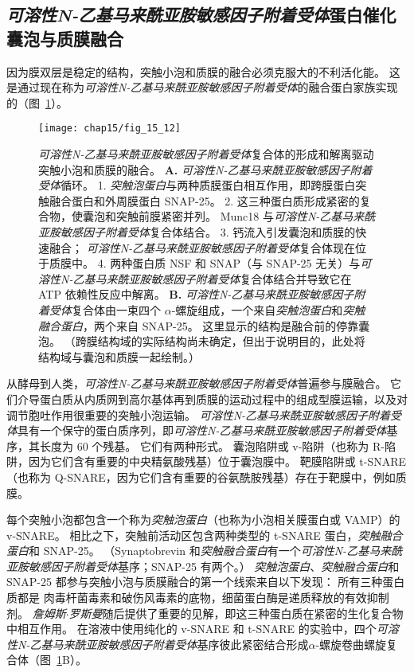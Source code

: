 \subsection{\textit{可溶性N-乙基马来酰亚胺敏感因子附着受体}蛋白催化囊泡与质膜融合}

因为膜双层是稳定的结构，突触小泡和质膜的融合必须克服大的不利活化能。
这是通过现在称为\textit{可溶性N-乙基马来酰亚胺敏感因子附着受体}的融合蛋白家族实现的（图~\ref{fig:15_12}）。


\begin{figure}[htbp]
	\centering
	\texttt{[image: chap15/fig\_15\_12]}
	\caption{\textit{可溶性N-乙基马来酰亚胺敏感因子附着受体}复合体的形成和解离驱动突触小泡和质膜的融合\cite{rizo2002snares}。
		 \textbf{A.} \textit{可溶性N-乙基马来酰亚胺敏感因子附着受体}循环。
		 1. \textit{突触泡蛋白}与两种质膜蛋白相互作用，即跨膜蛋白突触融合蛋白和外周膜蛋白 SNAP-25。
		 2. 这三种蛋白质形成紧密的复合物，使囊泡和突触前膜紧密并列。
		 Munc18 与\textit{可溶性N-乙基马来酰亚胺敏感因子附着受体}复合体结合。
		 3. 钙流入引发囊泡和质膜的快速融合；
		 \textit{可溶性N-乙基马来酰亚胺敏感因子附着受体}复合体现在位于质膜中。
		 4. 两种蛋白质 NSF 和 SNAP（与 SNAP-25 无关）与\textit{可溶性N-乙基马来酰亚胺敏感因子附着受体}复合体结合并导致它在 ATP 依赖性反应中解离。
		 \textbf{B.} \textit{可溶性N-乙基马来酰亚胺敏感因子附着受体}复合体由一束四个 $\alpha$-螺旋组成，一个来自\textit{突触泡蛋白}和\textit{突触融合蛋白}，两个来自 SNAP-25。
		 这里显示的结构是融合前的停靠囊泡。
		 （跨膜结构域的实际结构尚未确定，但出于说明目的，此处将结构域与囊泡和质膜一起绘制。）}
	\label{fig:15_12}
\end{figure}


从酵母到人类，\textit{可溶性N-乙基马来酰亚胺敏感因子附着受体}普遍参与膜融合。
它们介导蛋白质从内质网到高尔基体再到质膜的运动过程中的组成型膜运输，以及对调节胞吐作用很重要的突触小泡运输。
\textit{可溶性N-乙基马来酰亚胺敏感因子附着受体}具有一个保守的蛋白质序列，即\textit{可溶性N-乙基马来酰亚胺敏感因子附着受体}基序，其长度为 60 个残基。
它们有两种形式。
囊泡陷阱或 v-陷阱（也称为 R-陷阱，因为它们含有重要的中央精氨酸残基）位于囊泡膜中。
靶膜陷阱或 t-SNARE（也称为 Q-SNARE，因为它们含有重要的谷氨酰胺残基）存在于靶膜中，例如质膜。


每个突触小泡都包含一个称为\textit{突触泡蛋白}（也称为小泡相关膜蛋白或 VAMP）的 v-SNARE。
相比之下，突触前活动区包含两种类型的 t-SNARE 蛋白，\textit{突触融合蛋白}和 SNAP-25。
（Synaptobrevin 和\textit{突触融合蛋白}有一个\textit{可溶性N-乙基马来酰亚胺敏感因子附着受体}基序；SNAP-25 有两个。）
\textit{突触泡蛋白}、\textit{突触融合蛋白}和 SNAP-25 都参与突触小泡与质膜融合的第一个线索来自以下发现：
所有三种蛋白质都是 肉毒杆菌毒素和破伤风毒素的底物，细菌蛋白酶是递质释放的有效抑制剂。
\textit{詹姆斯$\cdot$罗斯曼}随后提供了重要的见解，即这三种蛋白质在紧密的生化复合物中相互作用。
在溶液中使用纯化的 v-SNARE 和 t-SNARE 的实验中，四个\textit{可溶性N-乙基马来酰亚胺敏感因子附着受体}基序彼此紧密结合形成$\alpha$-螺旋卷曲螺旋复合体（图~\ref{fig:15_12}B）。


